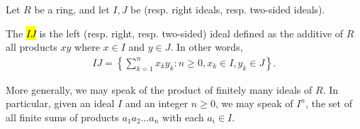 
\begin{definition} \label{definition:product_of_ideals_of_a_ring}
    Let $R$ be a ring, and let $I, J$ be  (resp. right ideals, resp. two-sided ideals).

    The  \hl{$I J$} is the left (resp. right, resp. two-sided) ideal defined as the additive  of $R$  all products $xy$ where $x \in I$ and $y \in J$. In other words,
    \begin{align*}
        IJ = \left \{ \sum_{k=1}^n x_ky_k : n \geq 0, x_k \in I, y_k \in J \right \}.
    \end{align*}

    More generally, we may speak of the product of finitely many ideals of $R$. In particular, given an ideal $I$ and an integer $n \geq 0$, we may speak of $I^n$, the set of all finite sums of products $a_1 a_2 \dots a_n$ with each $a_i \in I$.
\end{definition}
